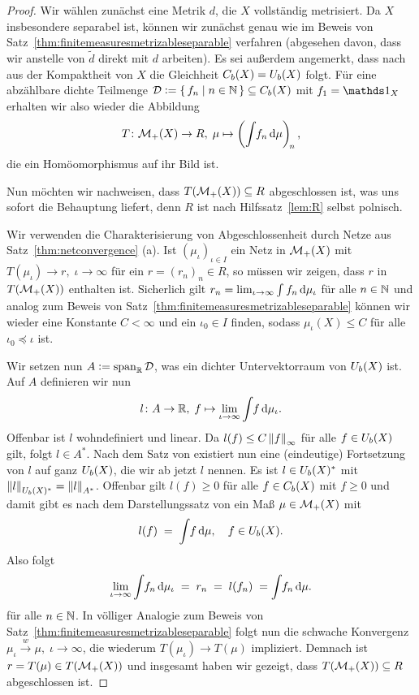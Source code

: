 \documentclass[../main/main.tex]{subfiles}
\begin{document}
	\begin{proof}
		Wir wählen zunächst eine Metrik $d$, die $X$ vollständig metrisiert. Da $X$ insbesondere separabel ist, können wir zunächst genau wie 
		im Beweis von Satz~\ref{thm:finitemeasuresmetrizableseparable} verfahren
		(abgesehen davon, dass wir anstelle von $\tilde{d}$ direkt mit $d$ arbeiten). Es sei außerdem angemerkt, dass nach \cite[Satz 2.3.10]{Simon.2015} aus der Kompaktheit von $X$ die Gleichheit $C_b(X) = U_b(X)$ folgt. Für eine abzählbare dichte Teilmenge 
		$\mathcal{D} \vcentcolon = \left\{\, f_n \; \middle| \; n \in \mathbb{N} \,\right\} \subseteq C_b(X)$ mit $f_1 = \indfct_X$ erhalten wir also wieder die Abbildung
		\[ T \colon \mathcal{M}_{+}(X) \to R, \; \mu \mapsto \left( \int_{} \, f_n \, \mathrm{d}\mu \right)_{\! n}  \text{,} \]
		die ein Homöomorphismus auf ihr Bild ist. 
		
		Nun möchten wir nachweisen, dass $T(\mathcal{M}_{+}(X)) \subseteq R$ abgeschlossen ist, was uns sofort die Behauptung liefert, denn $R$ ist nach Hilfssatz~\ref{lem:R} selbst polnisch.
		
		Wir verwenden die Charakterisierung von Abgeschlossenheit 
		durch Netze aus Satz~\ref{thm:netconvergence} (a). Ist $(\mu_\iota)_{\iota \in I}$ ein Netz in $\mathcal{M}_{+}(X)$ mit $T(\mu_\iota) \to r, \; \iota \to \infty$
		für ein $r = (r_n)_n \in R$, so müssen wir zeigen, dass $r$ in $T(\mathcal{M}_{+}(X))$ enthalten ist. Sicherlich gilt
		$r_n = \lim_{\iota \to \infty} \int_{} \, f_n \, \mathrm{d}\mu_\iota$ für alle $n \in \mathbb{N}$ und analog zum Beweis von Satz~\ref{thm:finitemeasuresmetrizableseparable} 
		können wir wieder eine Konstante $C < \infty$ und ein $\iota_0 \in I$ finden, sodass $\mu_\iota(X) \leq C$ für alle $\iota_0 \preceq \iota$ ist.
		
		Wir setzen nun $A \vcentcolon = \mathrm{span}_{\mathbb{R}} \, \mathcal{D}$, was ein dichter Untervektorraum von $U_b(X)$ ist. Auf $A$ definieren wir nun
		\[ l \colon A \to \mathbb{R}, \; f \mapsto \lim_{\iota \to \infty} \int_{} \, f \, \mathrm{d}\mu_\iota  \text{.} \]
		Offenbar ist $l$ wohndefiniert und linear. Da $l(f) \leq C \left\lVert f\right\rVert_\infty$ für alle $f \in U_b(X)$ gilt, folgt $l \in A^\ast$. Nach dem Satz von 
		existiert nun eine (eindeutige) Fortsetzung von $l$ auf ganz $U_b(X)$, die wir ab jetzt $l$ nennen. Es ist $l \in U_b(X)^\ast$ 
		mit $\left\lVert l\right\rVert_{U_b(X)^\ast} = \left\lVert l\right\rVert_{A^\ast}$. Offenbar gilt $l(f) \geq 0$ für alle $f \in C_b(X)$ mit $f \geq 0$ und damit gibt es 
		nach dem Darstellungssatz von  ein Maß $\mu \in \mathcal{M}_{+}(X)$ mit 
		\[ l(f) \; = \; \int_{} \, f \, \mathrm{d}\mu, \quad f \in U_b(X) \text{.} \]
		Also folgt
		\[ \lim_{\iota \to \infty} \int_{} \, f_n \, \mathrm{d}\mu_\iota \; = \; r_n \; = \; l(f_n) \; = \int_{} \, f_n \, \mathrm{d}\mu \text{.} \]
		für alle $n \in \mathbb{N}$. In völliger Analogie zum Beweis von Satz~\ref{thm:finitemeasuresmetrizableseparable} folgt nun die schwache Konvergenz $\mu_\iota \xrightarrow{w} \mu, \; \iota \to \infty$,
		die wiederum $T(\mu_\iota) \to T(\mu)$ impliziert. Demnach ist $r = T(\mu) \in T(\mathcal{M}_{+}(X))$ und insgesamt haben wir gezeigt, dass $T(\mathcal{M}_{+}(X)) \subseteq R$ abgeschlossen ist.
	\end{proof}
\end{document}
